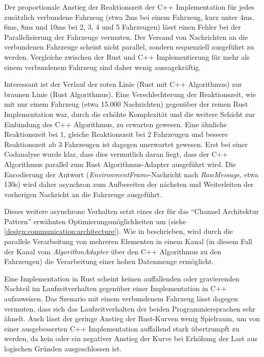 Der proportionale Anstieg der Reaktionszeit der C++ Implementation für jedes zusätzlich verbundene Fahrzeug (etwa 2ms bei einem Fahrzeug, kurz unter 4ms, 6ms, 8ms und 10ms bei 2, 3, 4 und 5 Fahrzeugen) lässt einen Fehler bei der Parallelisierung der Fahrzeuge vermuten.
Der Versand von Nachrichten an die verbundenen Fahrzeuge scheint nicht parallel, sondern sequenziell ausgeführt zu werden.
Vergleiche zwischen der Rust und C++ Implementierung für mehr als einem verbundenem Fahrzeug sind daher wenig aussagekräftig.


Interessant ist der Verlauf der roten Linie (Rust mit C++ Algorithmus) zur braunen Linie (Rust Algorithmus).
Eine Verschlechterung der Reaktionszeit, wie mit nur einem Fahrzeug (etwa 15.000 Nachrichten) gegenüber der reinen Rust Implementation war, durch die erhöhte Komplexität und die weitere Schicht zur Einbindung des C++ Algorithmus, zu erwarten gewesen.
Eine ähnliche Reaktionszeit bei 1, gleiche Reaktionszeit bei 2 Fahrzeugen und bessere Reaktionszeit ab 3 Fahrzeugen ist dagegen unerwartet gewesen.
Erst bei einer Codanalyse wurde klar, dass dies vermutlich daran liegt, dass der C++ Algorithmus parallel zum Rust Algorithmus-Adapter ausgeführt wird.
Die Encodierung der Antwort (\textit{EnvironmentFrame}-Nachricht nach \textit{RawMessage}, etwa 130\textmu s) wird daher asynchron zum Aufbereiten der nächsten und Weiterleiten der vorherigen Nachricht an die Fahrzeuge ausgeführt.

Dieses weitere asynchrone Verhalten setzt eines der für das \enquote{Channel Architektur Pattern} erwähnten Optimierungsmöglichkeiten um (siehe \autoref{design:communication:architecture}).
Wie in \cite[160]{douglass2003real} beschrieben, wird durch die parallele Verarbeitung von mehreren Elementen in einem Kanal (in diesem Fall der Kanal vom \textit{AlgorithmAdapter} über den C++ Algorithmus zu den Fahrzeugen) die Verarbeitung einer hohen Datenmenge ermöglicht.

Eine Implementation in Rust scheint keinen auffallenden oder gravierenden Nachteil im Laufzeitverhalten gegenüber einer Implementation in C++ aufzuweisen.
Das Szenario mit einem verbundenem Fahrzeug lässt dagegen vermuten, dass sich das Laufzeitverhalten der beiden Programmiersprachen sehr ähnelt.
Auch lässt der geringe Anstieg der Rust-Kurven wenig Spielraum, um von einer ausgebesserten C++ Implementation auffallend stark übertrumpft zu werden, da
kein oder ein negativer Anstieg der Kurve bei Erhöhung der Last aus logischen Gründen ausgeschlossen ist.


